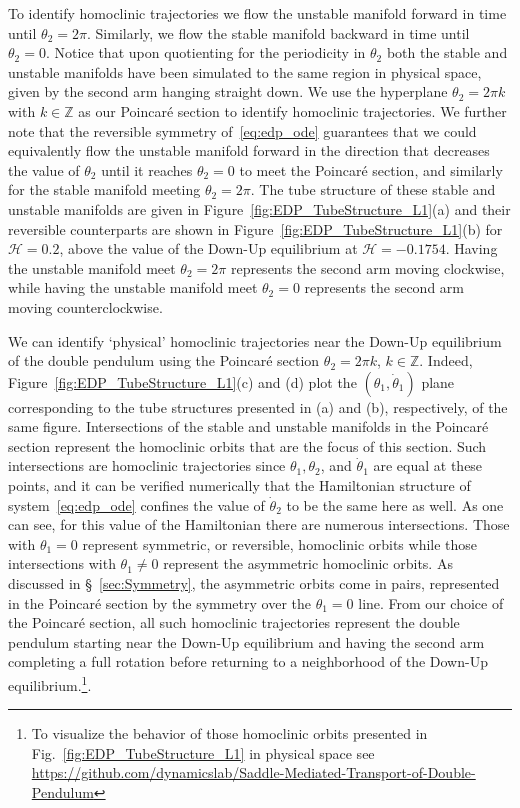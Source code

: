 \documentclass[11pt]{article}
\numberwithin{equation}{section}
\theoremstyle{plain}
\begin{document}
To identify homoclinic trajectories we flow the unstable manifold forward in time until $\theta_2 = 2\pi$. Similarly, we flow the stable manifold backward in time until $\theta_2 = 0$. Notice that upon quotienting for the periodicity in $\theta_2$ both the stable and unstable manifolds have been simulated to the same region in physical space, given by the second arm hanging straight down. We use the hyperplane $\theta_2 = 2\pi k$ with $k \in \mathbb{Z}$ as our Poincar\'e section to identify homoclinic trajectories. We further note that the reversible symmetry of~\eqref{eq:edp_ode} guarantees that we could equivalently flow the unstable manifold forward in the direction that decreases the value of $\theta_2$ until it reaches $\theta_2 = 0$ to meet the Poincar\'e section, and similarly for the stable manifold meeting $\theta_2 = 2\pi$. The tube structure of these stable and unstable manifolds are given in Figure~\ref{fig:EDP_TubeStructure_L1}(a) and their reversible counterparts are shown in Figure~\ref{fig:EDP_TubeStructure_L1}(b) for $\mathcal{H} = 0.2$, above the value of the Down-Up equilibrium at $\mathcal{H} = -0.1754$. Having the unstable manifold meet $\theta_2 = 2\pi$ represents the second arm moving clockwise, while having the unstable manifold meet $\theta_2 = 0$ represents the second arm moving counterclockwise.

We can identify `physical' homoclinic trajectories near the Down-Up equilibrium of the double pendulum using the Poincar\'e section $\theta_2 = 2\pi k$, $k \in \mathbb{Z}$. Indeed, Figure~\ref{fig:EDP_TubeStructure_L1}(c) and (d) plot the $(\theta_1,\dot\theta_1)$ plane corresponding to the tube structures presented in (a) and (b), respectively, of the same figure. Intersections of the stable and unstable manifolds in the Poincar\'e section represent the homoclinic orbits that are the focus of this section. Such intersections are homoclinic trajectories since $\theta_1,\theta_2$, and $\dot\theta_1$ are equal at these points, and it can be verified numerically that the Hamiltonian structure of system~\eqref{eq:edp_ode} confines the value of $\dot\theta_2$ to be the same here as well. As one can see, for this value of the Hamiltonian there are numerous intersections. Those with $\theta_1 = 0$ represent symmetric, or reversible, homoclinic orbits while those intersections with $\theta_1 \neq 0$ represent the asymmetric homoclinic orbits. As discussed in \S~\ref{sec:Symmetry}, the asymmetric orbits come in pairs, represented in the Poincar\'e section by the symmetry over the $\theta_1 = 0$ line. From our choice of the Poincar\'e section, all such homoclinic trajectories represent the double pendulum starting near the Down-Up equilibrium and having the second arm completing a full rotation before returning to a neighborhood of the Down-Up equilibrium.\footnote{To visualize the behavior of those homoclinic orbits presented in Fig.~\ref{fig:EDP_TubeStructure_L1} in physical space see \href{https://github.com/dynamicslab/Saddle-Mediated-Transport-of-Double-Pendulum}{https://github.com/dynamicslab/Saddle-Mediated-Transport-of-Double-Pendulum}}.
\end{document}

